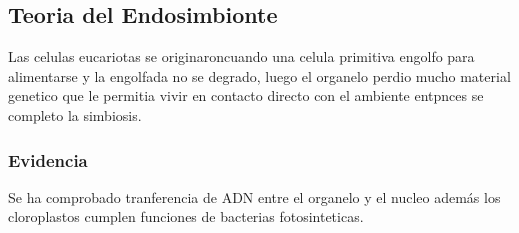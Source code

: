 \documentclass{article}
\begin{document}
\subsection*{Teoria del Endosimbionte}
Las celulas eucariotas se originaroncuando una celula primitiva engolfo para alimentarse y la engolfada no se degrado, luego el organelo perdio mucho material genetico que le permitia vivir en contacto directo con el ambiente entpnces se completo la simbiosis.

\subsubsection*{Evidencia}
Se ha comprobado tranferencia de ADN entre el organelo y el nucleo además los cloroplastos cumplen funciones de bacterias fotosinteticas.
\end{document}
